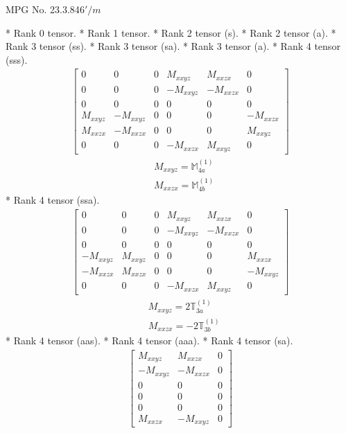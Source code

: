 \documentclass[fleqn,8pt,landscape]{jsarticle}
\begin{document}
\setcounter{MaxMatrixCols}{32}

\renewcommand{\tablename}{Table~}
\renewcommand{\figurename}{Figure~}
\begin{center}
\LARGE
MPG No. 23.3.84\quad$6'/m$
\end{center}
* Rank 0 tensor.
* Rank 1 tensor.
* Rank 2 tensor (s).
* Rank 2 tensor (a).
* Rank 3 tensor (ss).
* Rank 3 tensor (sa).
* Rank 3 tensor (a).
* Rank 4 tensor (sss).
\begin{align*}
\begin{bmatrix} 0 & 0 & 0 & M_{xxyz} & M_{xxzx} & 0 \\ 0 & 0 & 0 & - M_{xxyz} & - M_{xxzx} & 0 \\ 0 & 0 & 0 & 0 & 0 & 0 \\ M_{xxyz} & - M_{xxyz} & 0 & 0 & 0 & - M_{xxzx} \\ M_{xxzx} & - M_{xxzx} & 0 & 0 & 0 & M_{xxyz} \\ 0 & 0 & 0 & - M_{xxzx} & M_{xxyz} & 0 \end{bmatrix}
\end{align*}
\begin{align*}
& M_{xxyz} = \mathbb{M}_{4a}^{(1)} \\
& M_{xxzx} = \mathbb{M}_{4b}^{(1)}
\end{align*}
* Rank 4 tensor (ssa).
\begin{align*}
\begin{bmatrix} 0 & 0 & 0 & M_{xxyz} & M_{xxzx} & 0 \\ 0 & 0 & 0 & - M_{xxyz} & - M_{xxzx} & 0 \\ 0 & 0 & 0 & 0 & 0 & 0 \\ - M_{xxyz} & M_{xxyz} & 0 & 0 & 0 & M_{xxzx} \\ - M_{xxzx} & M_{xxzx} & 0 & 0 & 0 & - M_{xxyz} \\ 0 & 0 & 0 & - M_{xxzx} & M_{xxyz} & 0 \end{bmatrix}
\end{align*}
\begin{align*}
& M_{xxyz} = 2 \mathbb{T}_{3a}^{(1)} \\
& M_{xxzx} = - 2 \mathbb{T}_{3b}^{(1)}
\end{align*}
* Rank 4 tensor (aas).
* Rank 4 tensor (aaa).
* Rank 4 tensor (sa).
\begin{align*}
\begin{bmatrix} M_{xxyz} & M_{xxzx} & 0 \\ - M_{xxyz} & - M_{xxzx} & 0 \\ 0 & 0 & 0 \\ 0 & 0 & 0 \\ 0 & 0 & 0 \\ M_{xxzx} & - M_{xxyz} & 0 \end{bmatrix}
\end{align*}
\end{document}

